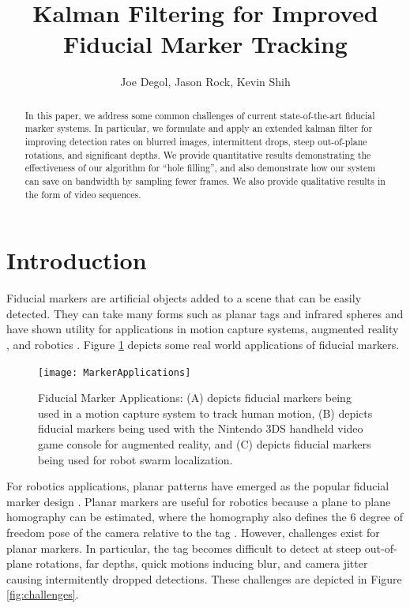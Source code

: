 \documentclass[letterpaper,10pt,conference]{IEEEtran}
\title{Kalman Filtering for Improved Fiducial Marker Tracking}
\author{Joe Degol, Jason Rock, Kevin Shih}
\begin{document}
\maketitle
\thispagestyle{empty}
\pagestyle{empty}



\begin{abstract}
In this paper, we address some common challenges of current state-of-the-art fiducial marker systems. In particular, we formulate and apply an extended kalman filter for improving detection rates on blurred images, intermittent drops, steep out-of-plane rotations, and significant depths. We provide quantitative results demonstrating the effectiveness of our algorithm for ``hole filling'', and also demonstrate how our system can save on bandwidth by sampling fewer frames. We also provide qualitative results in the form of video sequences.
\end{abstract}



\section{Introduction}
Fiducial markers are artificial objects added to a scene that can be easily detected. They can take many forms such as planar tags and infrared spheres and have shown utility for applications in motion capture systems, augmented reality \cite{Fiala2005}\cite{Fiala2010}, and robotics \cite{Olson2011}. Figure \ref{fig:applications} depicts some real world applications of fiducial markers.

\begin{figure}
\centering
\texttt{[image: MarkerApplications]}
\caption{Fiducial Marker Applications: (A) depicts fiducial markers being used in a motion capture system to track human motion, (B) depicts fiducial markers being used with the Nintendo 3DS handheld video game console for augmented reality, and (C) depicts fiducial markers being used for robot swarm localization.}
\label{fig:applications}
\end{figure}

For robotics applications, planar patterns have emerged as the popular fiducial marker design \cite{Sattar2007,Olson2011}. Planar markers are useful for robotics because a plane to plane homography can be estimated, where the homography also defines the 6 degree of freedom pose of the camera relative to the tag \cite{Olson2011}. However, challenges exist for planar markers. In particular, the tag becomes difficult to detect at steep out-of-plane rotations, far depths, quick motions inducing blur, and camera jitter causing intermitently dropped detections. These challenges are depicted in Figure \ref{fig:challenges}.
\end{document}
